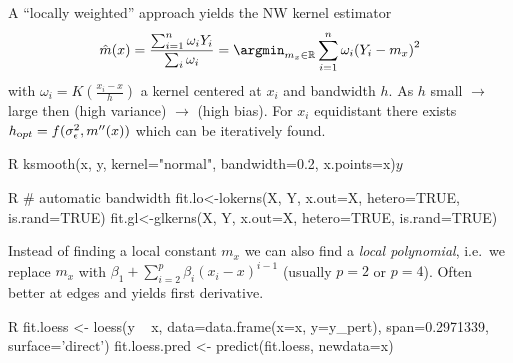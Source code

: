 \begin{sectionbox}\nospacing{}
  A ``locally weighted'' approach yields the NW kernel estimator
  \begin{equation}\label{eq:nw_regressor}
  \hat m(x) = \frac{\sum_{i=1}^{n} \omega_{i}Y_{i}}{\sum_{i}\omega_{i}} = \argmin_{m_{x} \in \mathbb{R}}\sum_{i=1}^{n}\omega_{i}{(Y_{i}-m_{x})}^{2}
  \end{equation}
  with $\omega_{i} = K\left(\frac{x_{i}-x}{h}\right)$ a kernel centered at $x_{i}$ and bandwidth $h$.
  As $h$ small $\rightarrow$ large then (high variance) $\rightarrow$ (high bias).
  For $x_{i}$ equidistant there exists $h_{\textrm opt} = f(\sigma_{\epsilon}^{2}, m''(x))$ which can be iteratively found.

\begin{mintlinebox}{R}
    ksmooth(x, y, kernel="normal", bandwidth=0.2, x.points=x)$y$
\end{mintlinebox}
\begin{mintlinebox}{R}
  # automatic bandwidth
  fit.lo<-lokerns(X, Y, x.out=X, hetero=TRUE, is.rand=TRUE)
  fit.gl<-glkerns(X, Y, x.out=X, hetero=TRUE, is.rand=TRUE)
\end{mintlinebox}
\end{sectionbox}

\begin{sectionbox}\nospacing{}
Instead of finding a local constant $m_{x}$ we can also find a \emph{local polynomial}, i.e.\ we replace $m_{x}$ with $\beta_{1} + \sum_{i=2}^{p} \beta_{i}{(x_{i}-x)}^{i-1}$ (usually $p=2$ or $p=4$).
Often better at edges and yields first derivative.
  \begin{mintlinebox}{R}
  fit.loess <- loess(y ~ x, data=data.frame(x=x, y=y_pert), span=0.2971339, surface='direct')
  fit.loess.pred <- predict(fit.loess, newdata=x)
  \end{mintlinebox}
\end{sectionbox}

